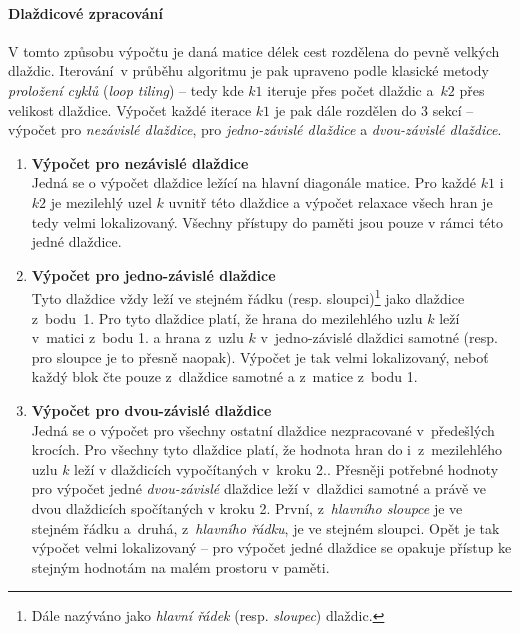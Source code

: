 \paragraph{Dlaždicové zpracování}
V tomto způsobu výpočtu je daná matice délek cest rozdělena do pevně velkých dlaždic. Iterování~v průběhu algoritmu je pak
upraveno podle klasické metody \emph{proložení cyklů} (\emph{loop tiling}) -- tedy kde $k1$ iteruje přes počet dlaždic 
a~$k2$ přes velikost dlaždice. Výpočet každé iterace $k1$ je pak dále rozdělen do
3 sekcí -- výpočet pro \emph{nezávislé dlaždice}, pro \emph{jedno-závislé dlaždice} a \emph{dvou-závislé dlaždice}.
\begin{enumerate}
    \item \textbf{Výpočet pro nezávislé dlaždice} \label{cuda:dlazdice:nezavisle} \\
        Jedná se o výpočet dlaždice ležící na hlavní diagonále matice. Pro každé $k1$ i~$k2$ je mezilehlý uzel $k$ uvnitř této
        dlaždice a výpočet relaxace všech hran je tedy velmi lokalizovaný. Všechny přístupy do paměti jsou pouze v rámci této jedné dlaždice.

    \item \textbf{Výpočet pro jedno-závislé dlaždice} \label{cuda:dlazdice:jednozavisle} \\ 
        Tyto dlaždice vždy leží ve stejném řádku (resp. sloupci)\footnote{Dále nazýváno jako \emph{hlavní řádek} (resp.
        \emph{sloupec}) dlaždic.} jako dlaždice z~bodu~1. Pro tyto dlaždice platí, že hrana do 
        mezilehlého uzlu $k$ leží v~matici z~bodu 1. a hrana z~uzlu $k$ v~jedno-závislé dlaždici samotné (resp. pro sloupce je to 
        přesně naopak). Výpočet je tak velmi lokalizovaný, neboť každý blok čte pouze z~dlaždice samotné a z~matice z~bodu 1.

    \item \textbf{Výpočet pro dvou-závislé dlaždice} \label{cuda:dlazdice:dvouzavisle} \\
        Jedná se o výpočet pro všechny ostatní dlaždice nezpracované v~předešlých krocích. Pro všechny tyto dlaždice platí, že 
        hodnota hran do i~z~mezilehlého uzlu $k$ leží v dlaždicích vypočítaných v~kroku 2.. Přesněji potřebné hodnoty pro výpočet
        jedné \emph{dvou-závislé} dlaždice leží v~dlaždici samotné a právě ve dvou dlaždicích spočítaných v kroku 2. První, 
        z~\emph{hlavního sloupce} je ve stejném řádku a~druhá, z~\emph{hlavního řádku}, je ve stejném sloupci. Opět je tak 
        výpočet velmi lokalizovaný -- pro výpočet jedné dlaždice se opakuje přístup ke stejným hodnotám na malém prostoru v paměti.

\end{enumerate}

